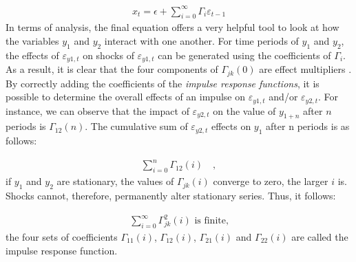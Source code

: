 \begin{align*}
    x_t = \epsilon + \sum_{i=0}^{\infty}\Gamma_i \varepsilon_{t-1}
\end{align*}
In terms of analysis, the final equation offers a very helpful tool to look at how the variables $y_1$ and $y_2$ interact with one another. For time periods of $y_1$ and $y_2$, the effects of $\varepsilon_{y1, t}$ on shocks of $\varepsilon_{y1, t}$ can be generated using the coefficients of $\Gamma_i$. As a result, it is clear that the four components of $\Gamma_{jk}(0)$ are effect multipliers \cite[p.295]{enders2008applied}.\\

By correctly adding the coefficients of the \textit{impulse response functions}, it is possible to determine the overall effects of an impulse on $\varepsilon_{y1, t}$ and/or $\varepsilon_{y2, t}$. For instance, we can observe that the impact of $\varepsilon_{y2, t}$ on the value of $y_{1+n}$ after $n$ periods is $\Gamma_{12}(n)$. The cumulative sum of $\varepsilon_{y2, t}$ effects on $y_1$ after n periods is as follows:

\begin{align*}
    \sum_{i=0}^{n}\Gamma_{12}(i) \quad ,
\end{align*}
if $y_1$ and $y_2$ are stationary, the values of $\Gamma_{jk}(i)$ converge to zero, the larger $i$ is. Shocks cannot, therefore, permanently alter stationary series. Thus, it follows:

\begin{align*}
    \sum_{i=0}^{\infty}\Gamma^2 _{jk}(i) \text{ is finite,}
\end{align*}
the four sets of coefficients $\Gamma_{11}(i)$, $\Gamma_{12}(i)$, $\Gamma_{21}(i)$ and $\Gamma_{22}(i)$ are called the impulse response function.\\



